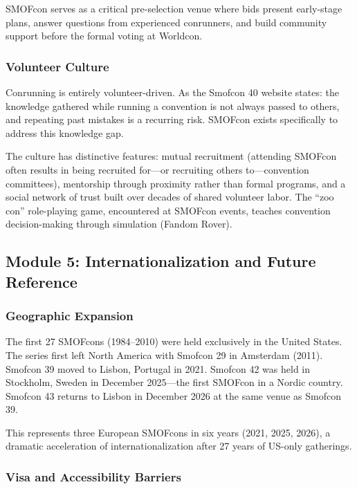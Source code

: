 \documentclass[11pt,letterpaper]{article}
\begin{document}
SMOFcon serves as a critical pre-selection venue where bids present early-stage plans, answer questions from experienced conrunners, and build community support before the formal voting at Worldcon.

\subsubsection{Volunteer Culture}

Conrunning is entirely volunteer-driven. As the Smofcon 40 website states: the knowledge gathered while running a convention is not always passed to others, and repeating past mistakes is a recurring risk. SMOFcon exists specifically to address this knowledge gap.

The culture has distinctive features: mutual recruitment (attending SMOFcon often results in being recruited for---or recruiting others to---convention committees), mentorship through proximity rather than formal programs, and a social network of trust built over decades of shared volunteer labor. The ``zoo con'' role-playing game, encountered at SMOFcon events, teaches convention decision-making through simulation (Fandom Rover).

\subsection{Module 5: Internationalization and Future Reference}

\subsubsection{Geographic Expansion}

The first 27 SMOFcons (1984--2010) were held exclusively in the United States. The series first left North America with Smofcon 29 in Amsterdam (2011). Smofcon 39 moved to Lisbon, Portugal in 2021. Smofcon 42 was held in Stockholm, Sweden in December 2025---the first SMOFcon in a Nordic country. Smofcon 43 returns to Lisbon in December 2026 at the same venue as Smofcon 39.

This represents three European SMOFcons in six years (2021, 2025, 2026), a dramatic acceleration of internationalization after 27 years of US-only gatherings.

\subsubsection{Visa and Accessibility Barriers}
\end{document}

